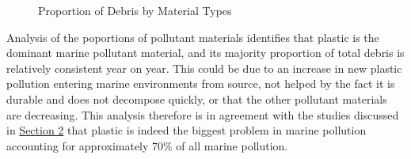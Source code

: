 \documentclass[10pt]{article}\usepackage[]{graphicx}\usepackage[]{color}
\newenvironment{knitrout}{}{} %
\begin{document}
\begin{figure}[H]
\begin{center}
\begin{knitrout}
\end{knitrout}
\caption {Proportion of Debris by Material Types}
\label{fig1}
\end {center}
\end {figure}

Analysis of the poportions of pollutant materials identifies that plastic is the dominant marine pollutant material, and its majority proportion of total debris is relatively consistent year on year. This could be due to an increase in new plastic pollution entering marine environments from source, not helped by the fact it is durable and does not decompose quickly, or that the other pollutant materials are decreasing. This analysis therefore is in agreement with the studies discussed in \hyperref[research]{Section 2} that plastic is indeed the biggest problem in marine pollution accounting for approximately 70\% of all marine pollution. 
\end{document}
